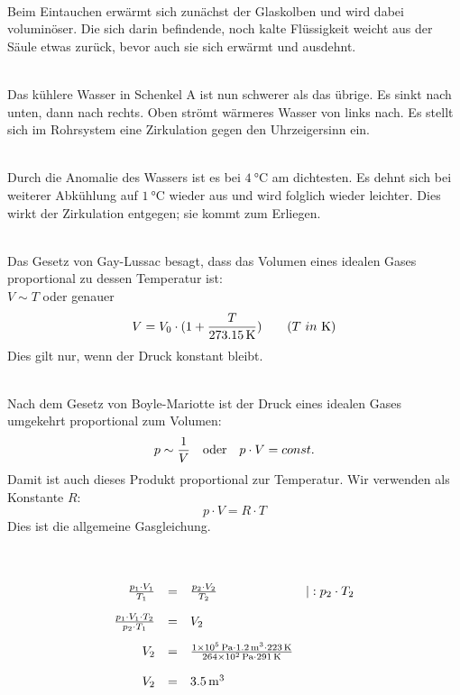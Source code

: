 \documentclass[a4paper]{article}
\begin{document}
\\
Beim Eintauchen erwärmt sich zunächst der Glaskolben und wird dabei voluminöser. Die sich darin befindende, noch kalte Flüssigkeit weicht aus der Säule etwas zurück, bevor auch sie sich erwärmt und ausdehnt.
\vspace{0.5 cm}

\\
Das kühlere Wasser in Schenkel A ist nun schwerer als das übrige. Es sinkt nach unten, dann nach rechts. Oben strömt wärmeres Wasser von links nach. Es stellt sich im Rohrsystem eine Zirkulation gegen den Uhrzeigersinn ein.
\vspace{0.5 cm}

\\
Durch die Anomalie des Wassers ist es bei $\SI{4}{\celsius}$ am dichtesten. Es dehnt sich bei weiterer Abkühlung auf $\SI{1}{\celsius}$ wieder aus und wird folglich wieder leichter. Dies wirkt der Zirkulation entgegen; sie kommt zum Erliegen.
\vspace{0.5 cm}

\\
Das Gesetz von Gay-Lussac besagt, dass das Volumen eines idealen Gases proportional zu dessen Temperatur ist:\\
$V \sim T $ oder genauer 
$$ V = V_0\cdot (1+ {T \over \SI{273,15}{\kelvin}})\qquad (T ~in~\SI{}{\kelvin}) $$ 
Dies gilt nur, wenn der Druck konstant bleibt.
\vspace{0.5 cm}

\\
Nach dem Gesetz von Boyle-Mariotte ist der Druck eines idealen Gases umgekehrt proportional zum Volumen:
$$ p \sim {1 \over V} \quad \textnormal{oder} \quad p \cdot V = const.$$
Damit ist auch dieses Produkt proportional zur Temperatur. Wir verwenden als Konstante $R$:
$$ p \cdot V = R \cdot T $$ 
Dies ist die allgemeine Gasgleichung.
\vspace{0.5 cm}

\\
$$
\renewcommand{\arraystretch}{2}
\begin{array}{rcll}
{p_1 \cdot V_1 \over T_1} &=& {p_2 \cdot V_2 \over T_2} & |: p_2 \cdot T_2 \\
{p_1 \cdot V_1 \cdot T_2 \over p_2 \cdot T_1} &=& V_2 \\
V_2 &=& {\SI{1e5}{\pascal} \cdot \SI{1,2}{\meter^3} \cdot \SI{223}{\kelvin} \over \SI{264e2}{\pascal} \cdot \SI{291}{\kelvin}}\\
V_2 &=& \SI{3,5}{\meter^3} 
\end{array}
$$
\vspace{0.5 cm}
\end{document}
